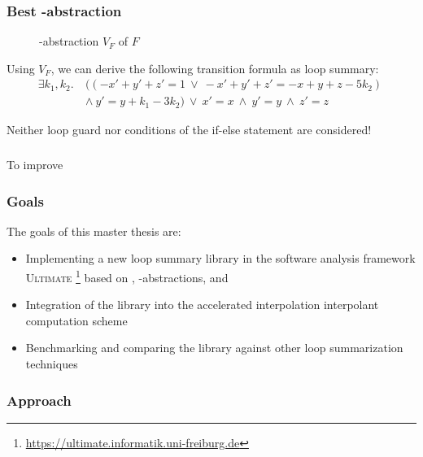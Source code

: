 \documentclass[%
10pt,
dvipsnames,
]{beamer}
\begin{document}
\begin{frame}[t]
	\frametitle{Best \qvasr-abstraction}
	\begin{center}
		\begin{figure}
		
		\caption*{\qvasr-abstraction $V_F$ of $F$}
		\end{figure}
	\end{center}
\pause
Using $V_F$, we can derive the following transition formula as loop summary:
	\begin{align*}
		\exists k_1, k_2.\ &((-x' + y' + z' = 1\ \lor\ -x' + y' + z' = -x + y + z - 5k_2)\ \\ &\land\ y' = y + k_1 - 3k_2)\ \lor\ x' = x\ \land\ y' = y\ \land\ z' = z
	\end{align*}
\pause
\begin{center}
\alert{Neither loop guard nor conditions of the if-else statement are considered!}
\end{center}
\end{frame}


\begin{frame}[t]
	\frametitle{\qvasrs}
	To improve
\end{frame}


\begin{frame}[t]
	\frametitle{Goals}
	The goals of this master thesis are:
	\begin{itemize}
		\item Implementing a new loop summary library in the software analysis framework \textsc{Ultimate} \footnote{\url{https://ultimate.informatik.uni-freiburg.de}} based on \qvasr, \qvasr-abstractions, and \qvasrs
		\item Integration of the library into the accelerated interpolation interpolant computation scheme
		\item Benchmarking and comparing the library against other loop summarization techniques
	\end{itemize}
\end{frame}

\begin{frame}[t]
	\frametitle{Approach}
	\resizebox{11cm}{!}{}
\end{frame}
\end{document}
